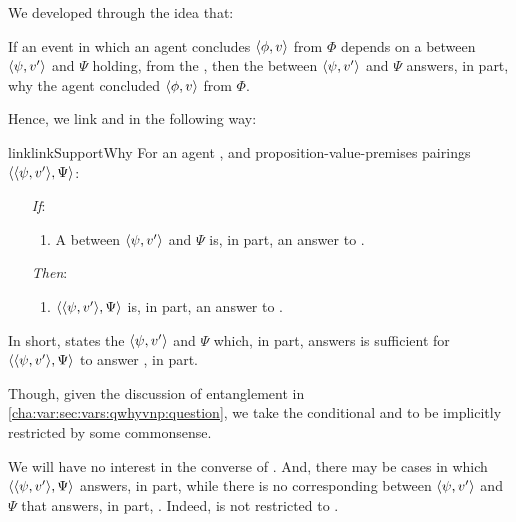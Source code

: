 \begin{note}
  We developed \qWhyVnP{} through the idea that:

  If an event in which an agent concludes \(\langle \phi, v \rangle\) from \(\Phi\) depends on a  between \(\langle \psi, v' \rangle\) and \(\Psi\) holding, from the \agpe{}, then the  between \(\langle \psi, v' \rangle\) and \(\Psi\) answers, in part, why the agent concluded \(\langle \phi, v \rangle\) from \(\Phi\).

  Hence, we link \qWhyVnP{} and \qWhy{} in the following way:

  \begin{restatable}{link}{linkSupportWhy}
    \label{link:why:support:pvpp}
    For an agent \vAgent{}, and proposition-value-premises pairings \(\langle \langle \psi, v' \rangle, \Psi \rangle\):

    \begin{itemize}
    \item[\emph{If}:]
      \begin{enumerate}[label=\alph*., ref=(\alph*)]
      \item
        A  between \(\langle \psi, v' \rangle\) and \(\Psi\) is, in part, an answer to \qWhyVnP{}.
      \end{enumerate}
    \item[\emph{Then}:]
      \begin{enumerate}[label=\alph*., ref=(\alph*), resume]
      \item
        \(\langle \langle \psi, v' \rangle, \Psi \rangle\) is, in part, an answer to \qWhy{}.
      \end{enumerate}
    \end{itemize}
    \vspace{-\baselineskip}
  \end{restatable}

  In short, \linkW{} states the \ros{} \(\langle \psi, v' \rangle\) and \(\Psi\) which, in part, answers \qWhyVnP{} is sufficient for \(\langle \langle \psi, v' \rangle, \Psi \rangle\) to answer \qWhy{}, in part.

  Though, given the discussion of entanglement in \autoref{cha:var:sec:vars:qwhyvnp:question}, we take the conditional and to be implicitly restricted by some commonsense.

  We will have no interest in the converse of \linkW{}.
  And, there may be cases in which \(\langle \langle \psi, v' \rangle, \Psi \rangle\) answers, in part, \qWhy{} while there is no corresponding \ros{} between \(\langle \psi, v' \rangle\) and \(\Psi\) that answers, in part, \qWhyVnP{}.
  Indeed, \qWhy{} is not restricted to .
\end{note}

